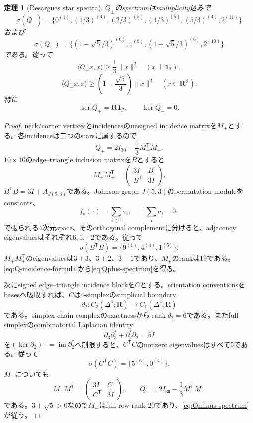 \documentclass[11pt,a4paper]{ltjsarticle}
\newtheorem{theorem}{定理}[section]
\theoremstyle{definition}
\theoremstyle{remark}
\newcommand{\RR}{\mathbf R}
\newcommand{\one}{\mathbf 1}
\begin{document}
\begin{theorem}[Desargues star spectra]\label{thm:desargues-star-spectra}
$Q_\pm$のspectrumはmultiplicity込みで
\begin{equation}\label{eq:Qplus-spectrum}
 \boxed{
 \sigma(Q_+)=
 \{0^{(1)},(1/3)^{(4)},(2/3)^{(5)},
 (4/3)^{(5)},(5/3)^{(4)},2^{(11)}\}
 }
\end{equation}
および
\begin{equation}\label{eq:Qminus-spectrum}
 \boxed{
 \sigma(Q_-)=
 \{(1-\sqrt5/3)^{(6)},1^{(8)},
 (1+\sqrt5/3)^{(6)},2^{(10)}\}
 }
\end{equation}
である。従って
\begin{equation}\label{eq:Qplus-gap}
 \langle Q_+x,x\rangle\ge\frac13\|x\|^2
 \quad
 (x\perp\one_{\mathcal I}),
\end{equation}
\begin{equation}\label{eq:Qminus-gap}
 \langle Q_-x,x\rangle
 \ge\left(1-\frac{\sqrt5}{3}\right)\|x\|^2
 \quad(x\in\RR^{\mathcal I}).
\end{equation}
特に
\[
 \ker Q_+=\RR\one_{\mathcal I},
 \qquad
 \ker Q_-=0.
\]
\end{theorem}

\begin{proof}
neck/corner verticesとincidencesのunsigned incidence matrixを$M_+$とする。各incidenceは二つのstarsに属するので
\begin{equation}\label{eq:Q-incidence-formula}
 Q_+=2I_{30}-\frac13M_+^{\mathsf T}M_+.
\end{equation}
$10\times10$のedge--triangle inclusion matrixを$B$とすると
\[
 M_+M_+^{\mathsf T}
 =\begin{pmatrix}3I&B\\B^{\mathsf T}&3I\end{pmatrix}.
\]
$B^{\mathsf T}B=3I+A_{J(5,3)}$である。Johnson graph $J(5,3)$のpermutation moduleをconstants、
\[
 f_a(\tau)=\sum_{i\in\tau}a_i,
 \qquad \sum_i a_i=0,
\]
で張られる4次元space、そのorthogonal complementに分けると、adjacency eigenvaluesはそれぞれ$6,1,-2$である。従って
\[
 \sigma(B^{\mathsf T}B)=\{9^{(1)},4^{(4)},1^{(5)}\}.
\]
$M_+M_+^{\mathsf T}$のeigenvaluesは$3\pm3$、$3\pm2$、$3\pm1$であり、$M_+$のrankは19である。
\eqref{eq:Q-incidence-formula}から\eqref{eq:Qplus-spectrum}を得る。

次にsigned edge--triangle incidence blockを$C$とする。orientation conventionsをbasesへ吸収すれば、$C$は4-simplexのsimplicial boundary
\[
 \partial_2:C_2(\Delta^4;\RR)\longrightarrow C_1(\Delta^4;\RR)
\]
である。simplex chain complexのexactnessから$\operatorname{rank}\partial_2=6$である。またfull simplexのcombinatorial Laplacian identity
\[
 \partial_3\partial_3^*+\partial_2^*\partial_2=5I
\]
を$(\ker\partial_2)^\perp=\operatorname{im}\partial_2^*$へ制限すると、$C^{\mathsf T}C$のnonzero eigenvaluesはすべて$5$である。従って
\[
 \sigma(C^{\mathsf T}C)=\{5^{(6)},0^{(4)}\}.
\]
$M_-$についても
\[
 M_-M_-^{\mathsf T}
 =\begin{pmatrix}3I&C\\C^{\mathsf T}&3I\end{pmatrix},
 \qquad
 Q_-=2I_{30}-\frac13M_-^{\mathsf T}M_-
\]
である。$3\pm\sqrt5>0$なので$M_-$はfull row rank 20であり、\eqref{eq:Qminus-spectrum}が従う。
\end{proof}
\end{document}
